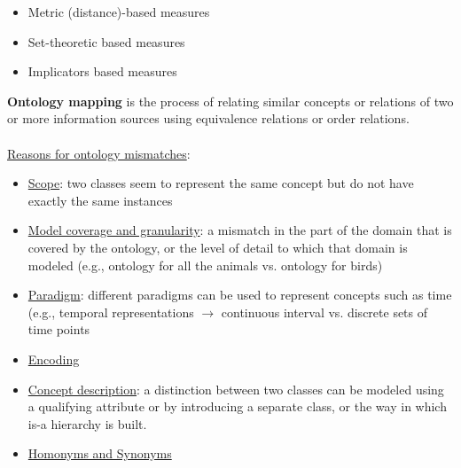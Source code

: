 \documentclass[10pt,a4paper]{article}
\newcommand{\nline}{\\~\\}
\begin{document}
\begin{justify}
\begin{itemize}
	\item Metric (distance)-based measures
	\item Set-theoretic based measures
	\item Implicators based measures
\end{itemize}
\textbf{Ontology mapping} is the process of relating similar concepts or relations of two or more information sources using equivalence relations or order relations.
\nline
\uline{Reasons for ontology mismatches}:
\begin{itemize}
	\item \uline{Scope}: two classes seem to represent the same concept but do not have exactly the same instances
	\item \uline{Model coverage and granularity}: a mismatch in the part of the domain that is covered by the ontology, or the level of detail to which that domain is modeled (e.g., ontology for all the animals vs. ontology for birds)
	\item \uline{Paradigm}: different paradigms can be used to represent concepts such as time (e.g., temporal representations $\rightarrow$ continuous interval vs. discrete sets of time points
	\item \uline{Encoding}
	\item \uline{Concept description}: a distinction between two classes can be modeled using a qualifying attribute or by introducing a separate class, or the way in which is-a hierarchy is built.
	\item \uline{Homonyms and Synonyms}
\end{itemize}
\pagebreak

\end{justify}
\end{document}
